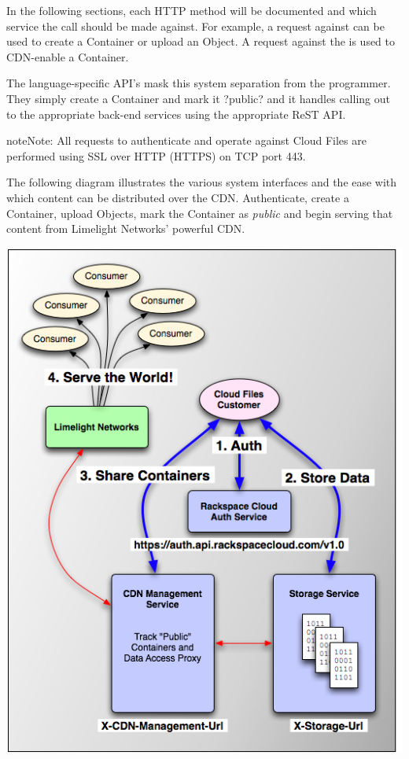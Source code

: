 \documentclass[letterpaper,10pt,english]{manual}
\begin{document}
In the following sections, each HTTP method will be documented and which
service the call should be made against.  For example, a  request
against  can be used to create a Container or upload an
Object.  A  request against the  is used
to CDN-enable a Container.

The language-specific API's mask this system separation from the
programmer.  They simply create a Container and mark it ?public? and it
handles calling out to the appropriate back-end services using the
appropriate ReST API.

\begin{notice}{note}{Note:}
All requests to authenticate and operate against Cloud Files are
performed using SSL over HTTP (HTTPS) on TCP port 443.
\end{notice}

The following diagram illustrates the various system interfaces and the
ease with which content can be distributed over the CDN.  Authenticate,
create a Container, upload Objects, mark the Container as \emph{public} and
begin serving that content from Limelight Networks' powerful CDN.

{\hfill\includegraphics{cf-systems.jpg}\hfill}
\end{document}
